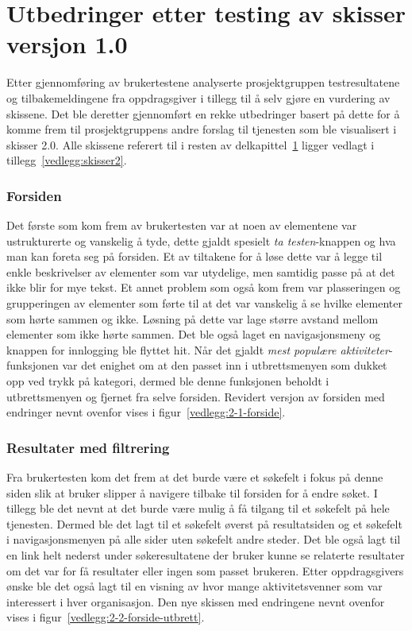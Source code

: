 \section{Utbedringer etter testing av skisser versjon 1.0}
\label{section:utbedringer-skisser-1}

Etter gjennomføring av brukertestene analyserte prosjektgruppen testresultatene og tilbakemeldingene fra oppdragsgiver i tillegg til å selv gjøre en vurdering av skissene. Det ble deretter gjennomført en rekke utbedringer basert på dette for å komme frem til prosjektgruppens andre forslag til tjenesten som ble visualisert i skisser 2.0. Alle skissene referert til i resten av delkapittel~\ref{section:utbedringer-skisser-1} ligger vedlagt i tillegg~\ref{vedlegg:skisser2}.

\subsubsection{Forsiden}

Det første som kom frem av brukertesten var at noen av elementene var ustrukturerte og vanskelig å tyde, dette gjaldt spesielt {\em  ta testen}-knappen og hva man kan foreta seg på forsiden. Et av tiltakene for å løse dette var å legge til enkle beskrivelser av elementer som var utydelige, men samtidig passe på at det ikke blir for mye tekst. Et annet problem som også kom frem var plasseringen og grupperingen av elementer som førte til at det var vanskelig å se hvilke elementer som hørte sammen og ikke. Løsning på dette var lage større avstand mellom elementer som ikke hørte sammen. Det ble også laget en navigasjonsmeny og knappen for innlogging ble flyttet hit. Når det gjaldt {\em  mest populære aktiviteter}-funksjonen var det enighet om at den passet inn i utbrettsmenyen som dukket opp ved trykk på kategori, dermed ble denne funksjonen beholdt i utbrettsmenyen og fjernet fra selve forsiden. Revidert versjon av forsiden med endringer nevnt ovenfor vises i figur~\ref{vedlegg:2-1-forside}.

\subsubsection{Resultater med filtrering}

Fra brukertesten kom det frem at det burde være et søkefelt i fokus på denne siden slik at bruker slipper å navigere tilbake til forsiden for å endre søket. I tillegg ble det nevnt at det burde være mulig å få tilgang til et søkefelt på hele tjenesten. Dermed ble det lagt til et søkefelt øverst på resultatsiden og et søkefelt i navigasjonsmenyen på alle sider uten søkefelt andre steder. Det ble også lagt til en link helt nederst under søkeresultatene der bruker kunne se relaterte resultater om det var for få resultater eller ingen som passet brukeren. Etter oppdragsgivers ønske ble det også lagt til en visning av hvor mange aktivitetsvenner som var interessert i hver organisasjon. Den nye skissen med endringene nevnt ovenfor vises i figur~\ref{vedlegg:2-2-forside-utbrett}.

